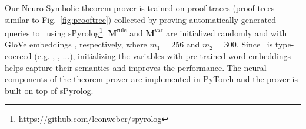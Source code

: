 Our Neuro-Symbolic theorem prover is trained on proof traces (proof trees similar to Fig.~\ref{fig:prooftree}) collected by proving automatically generated queries to \KB~using sPyrolog\footnote{\url{https://github.com/leonweber/spyrolog}}. 
$\mathbf{M}^{\text{rule}}$ and $\mathbf{M}^{\text{var}}$ are initialized randomly and with GloVe embeddings \cite{pennington2014glove}, respectively, where $m_1=256$ and $m_2=300$. Since \KB~is type-coerced (e.g. , , $\dots$), initializing the variables with pre-trained word embeddings helps capture their semantics and improves the performance. %
The neural components of the theorem prover are implemented in PyTorch \cite{paszke2017automatic} and the prover is built on top of sPyrolog.%
